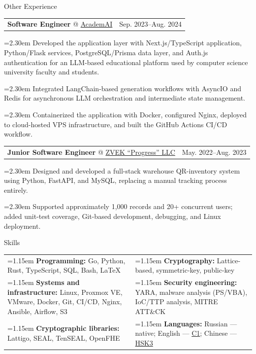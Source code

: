 \documentclass[11pt,a4paper]{article}
\makeatletter
\newcommand{\cvrow}[2]{%
  \noindent
  \begin{minipage}[t]{0.145\textwidth}
    \vspace{0pt}%
    \raggedright
    \fontsize{10.5}{12.5}\selectfont
    #1
  \end{minipage}%
  \hfill
  \begin{minipage}[t]{0.835\textwidth}
    \vspace{0pt}%
    #2
  \end{minipage}\par
}
\newcommand{\skillcell}[2]{%
  \noindent
  \hangindent=1.15em
  \hangafter=1
  \makebox[1.15em][l]{$\diamond$}%
  \textbf{#1} #2%
}
\newcommand{\workentry}[2]{%
  \noindent
  \begin{tabularx}{\linewidth}
    {@{}X@{\hspace{0.8em}}r@{}}
    #1 & \small #2
  \end{tabularx}\par
  \vspace{0.15em}
}
\newcommand{\workproject}[1]{%
  \noindent
  \hangindent=2.30em
  \hangafter=1
  \hspace*{1.15em}\makebox[1.15em][l]{$\diamond$}#1\par
  \vspace{0.12em}
}
\makeatother
\begin{document}
\vspace{0.50em}

\cvrow{Other Experience}{%
  \workentry
    {\textbf{Software Engineer} @ \href{https://academai.ru/}{AcademAI}}
    {Sep. 2023--Aug. 2024}
  \workproject{Developed the application layer with Next.js/TypeScript application,
  Python/Flask services, PostgreSQL/Prisma data layer, and Auth.js authentication
  for an LLM-based educational platform used by computer science university faculty
  and students.}
  \workproject{Integrated LangChain-based generation workflows with AsyncIO and Redis for
  asynchronous LLM orchestration and intermediate state management.}
  \workproject{Containerized the application with Docker, configured Nginx, deployed
  to cloud-hosted VPS infrastructure, and built the GitHub Actions CI/CD workflow.}
}

\cvrow{}{%
  \workentry
    {\textbf{Junior Software Engineer} @
    \href{https://zvekprogress.ru/}{ZVEK ``Progress'' LLC}}
    {May. 2022--Aug. 2023}

  \workproject{Designed and developed a full-stack warehouse QR-inventory system
  using Python, FastAPI, and MySQL, replacing a manual tracking process entirely.}

  \workproject{Supported approximately 1,000 records and 20+ concurrent users;
  added unit-test coverage, Git-based development, debugging, and Linux deployment.}
}

\vspace{0.75em}

\cvrow{Skills}{%
  \begin{tabularx}{\linewidth}
    {@{}>{\raggedright\arraybackslash}X
    @{\hspace{1.2em}}
    >{\raggedright\arraybackslash}X@{}}

    \skillcell{Programming:}{%
      Go, Python, Rust, TypeScript, SQL, Bash, LaTeX}
    &
    \skillcell{Cryptography:}{%
      Lattice-based, symmetric-key,
      public-key}
    \\[0.20em]

    \skillcell{Systems and infrastructure:}{%
      Linux, Proxmox VE, VMware, Docker, Git, CI/CD, Nginx, Ansible,
      Airflow, S3}
    &
    \skillcell{Security engineering:}{%
      YARA, malware analysis (PS/VBA), IoC/TTP analysis,
      MITRE ATT\&CK}
    \\[0.20em]

    \skillcell{Cryptographic libraries:}{%
      Lattigo, SEAL, TenSEAL, OpenFHE}
    &
    \skillcell{Languages:}{%
      Russian --- native;
      English --- \href{https://iasenovets.github.io/files/toefl_8cd5f4a2b8ec8f34da49ea0faeef43f1.pdf}{C1};
      Chinese --- \href{https://admin.chinesetest.cn/queryScore.do?sid=c2tActR9Wb\%2704b861aefbdc5e9fd0b44afa717d08cbceb0720e582ce25f\%2724d7sWsQ5nVUQSwD}{HSK3}}
  \end{tabularx}
}
\end{document}
